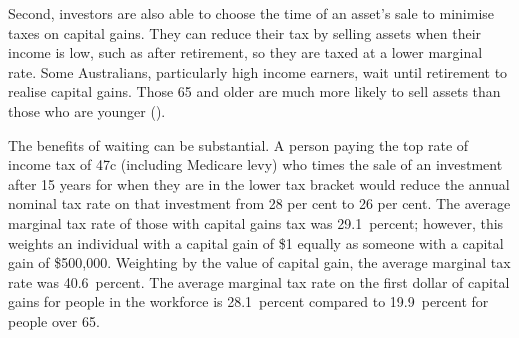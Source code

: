 \documentclass{grattan}\usepackage[]{graphicx}\usepackage[]{color}
\begin{document}
Second, investors are also able to choose the time of an asset's sale to minimise taxes on capital gains. They can reduce their tax by selling assets when their income is low, such as after retirement, so they are taxed at a lower marginal rate. Some Australians, particularly high income earners, wait until retirement to realise capital gains. Those 65 and older are much more likely to sell assets than those who are younger ().



The benefits of waiting can be substantial. A person paying the top rate of income tax of 47c (including Medicare levy) who times the sale of an investment after 15 years for when they are in the lower tax bracket would reduce the annual nominal tax rate on that investment from 28 per cent to 26 per cent. The average marginal tax rate of those with capital gains tax was 29.1~percent; however, this weights an individual with a capital gain of \$1 equally as someone with a capital gain of \$500,000. Weighting by the value of capital gain, the average marginal tax rate was 40.6~percent. The average marginal tax rate on the first dollar of capital gains for people in the workforce is 28.1~percent compared to 19.9~percent for people over 65.
\end{document}
